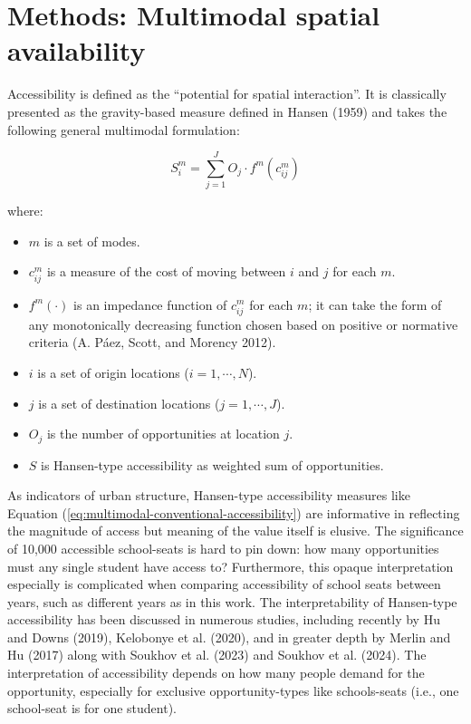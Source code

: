 \documentclass[
default
]{sn-jnl}
\providecommand{\tightlist}{%
  \setlength{\itemsep}{0pt}\setlength{\parskip}{0pt}}\usepackage{longtable,booktabs,array}
\begin{document}
\section{Methods: Multimodal spatial
availability}\label{methods-multimodal-spatial-availability}

Accessibility is defined as the ``potential for spatial interaction''.
It is classically presented as the gravity-based measure defined in
Hansen (1959) and takes the following general multimodal formulation:

\begin{equation}
\label{eq:multimodal-conventional-accessibility}
S_i^m = \sum_{j=1}^JO_j \cdot f^m(c_{ij}^m)
\end{equation}

\noindent where:

\begin{itemize}
\tightlist
\item
  \(m\) is a set of modes.
\item
  \(c_{ij}^m\) is a measure of the cost of moving between \(i\) and
  \(j\) for each \(m\).
\item
  \(f^m(\cdot)\) is an impedance function of \(c_{ij}^m\) for each
  \(m\); it can take the form of any monotonically decreasing function
  chosen based on positive or normative criteria (A. Páez, Scott, and
  Morency 2012).
\item
  \(i\) is a set of origin locations (\(i = 1,\cdots,N\)).
\item
  \(j\) is a set of destination locations (\(j = 1,\cdots,J\)).
\item
  \(O_j\) is the number of opportunities at location \(j\).
\item
  \(S\) is Hansen-type accessibility as weighted sum of opportunities.
\end{itemize}

As indicators of urban structure, Hansen-type accessibility measures
like Equation (\ref{eq:multimodal-conventional-accessibility}) are
informative in reflecting the magnitude of access but meaning of the
value itself is elusive. The significance of 10,000 accessible
school-seats is hard to pin down: how many opportunities must any single
student have access to? Furthermore, this opaque interpretation
especially is complicated when comparing accessibility of school seats
between years, such as different years as in this work. The
interpretability of Hansen-type accessibility has been discussed in
numerous studies, including recently by Hu and Downs (2019), Kelobonye
et al. (2020), and in greater depth by Merlin and Hu (2017) along with
Soukhov et al. (2023) and Soukhov et al. (2024). The interpretation of
accessibility depends on how many people demand for the opportunity,
especially for exclusive opportunity-types like schools-seats (i.e., one
school-seat is for one student).
\end{document}

